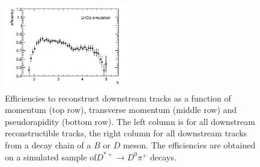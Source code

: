 \begin{figure}[tbph]
\begin{center}
\includegraphics[width = 0.49\textwidth]{figures/EffPatLLT/overall/DstD0piFromBDEta.png}
\caption{Efficiencies to reconstruct downstream tracks as a function of momentum (top row), transverse momentum (middle row) and pseudorapidity (bottom row). The left column is for all downstream reconstructible tracks, the right column for all downstream tracks from a decay chain of a $B$ or $D$ meson. The efficiencies are obtained on a simulated sample of$D^{*+} \rightarrow D^{0}\pi^+$ decays.}
\label{fig:EffPatLLTDstD0pi}
 \end{center}
 \end{figure}

